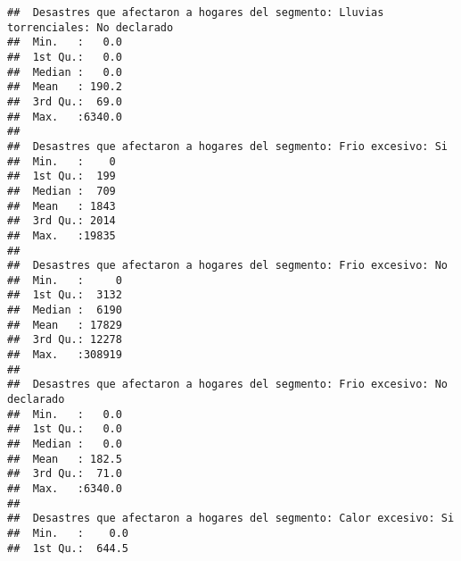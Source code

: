 \documentclass[11pt,]{article}
\begin{document}
\begin{verbatim}
##  Desastres que afectaron a hogares del segmento: Lluvias torrenciales: No declarado
##  Min.   :   0.0                                                                    
##  1st Qu.:   0.0                                                                    
##  Median :   0.0                                                                    
##  Mean   : 190.2                                                                    
##  3rd Qu.:  69.0                                                                    
##  Max.   :6340.0                                                                    
##                                                                                    
##  Desastres que afectaron a hogares del segmento: Frio excesivo: Si
##  Min.   :    0                                                    
##  1st Qu.:  199                                                    
##  Median :  709                                                    
##  Mean   : 1843                                                    
##  3rd Qu.: 2014                                                    
##  Max.   :19835                                                    
##                                                                   
##  Desastres que afectaron a hogares del segmento: Frio excesivo: No
##  Min.   :     0                                                   
##  1st Qu.:  3132                                                   
##  Median :  6190                                                   
##  Mean   : 17829                                                   
##  3rd Qu.: 12278                                                   
##  Max.   :308919                                                   
##                                                                   
##  Desastres que afectaron a hogares del segmento: Frio excesivo: No declarado
##  Min.   :   0.0                                                             
##  1st Qu.:   0.0                                                             
##  Median :   0.0                                                             
##  Mean   : 182.5                                                             
##  3rd Qu.:  71.0                                                             
##  Max.   :6340.0                                                             
##                                                                             
##  Desastres que afectaron a hogares del segmento: Calor excesivo: Si
##  Min.   :    0.0                                                   
##  1st Qu.:  644.5                                                   

\end{verbatim}
\end{document}
